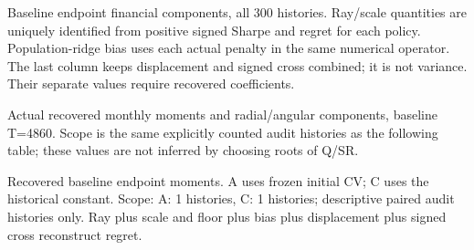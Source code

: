 \begin{table}[htbp]\centering\scriptsize
\caption{Baseline endpoint financial components, all 300 histories. Ray/scale quantities are uniquely identified from positive signed Sharpe and regret for each policy. Population-ridge bias uses each actual penalty in the same numerical operator. The last column keeps displacement and signed cross combined; it is not variance. Their separate values require recovered coefficients.}
\resizebox{\textwidth}{!}{}
\end{table}
\begin{table}[htbp]\centering\scriptsize
\caption{Actual recovered monthly moments and radial/angular components, baseline T=4860. Scope is the same explicitly counted audit histories as the following table; these values are not inferred by choosing roots of Q/SR.}
\resizebox{\textwidth}{!}{}
\end{table}
\begin{table}[htbp]\centering\scriptsize
\caption{Recovered baseline endpoint moments. A uses frozen initial CV; C uses the historical constant. Scope: A: 1 histories, C: 1 histories; descriptive paired audit histories only. Ray plus scale and floor plus bias plus displacement plus signed cross reconstruct regret.}
\resizebox{\textwidth}{!}{}
\end{table}
